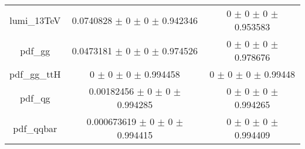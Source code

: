 \begin{table}
\begin{tabular}{ccc}
lumi\_13TeV & \num{0.0740828} $\pm$ \num{0} $\pm$ \num{0} $\pm$ \num{0.942346} & \num{0} $\pm$ \num{0} $\pm$ \num{0} $\pm$ \num{0.953583}\\
pdf\_gg & \num{0.0473181} $\pm$ \num{0} $\pm$ \num{0} $\pm$ \num{0.974526} & \num{0} $\pm$ \num{0} $\pm$ \num{0} $\pm$ \num{0.978676}\\
pdf\_gg\_ttH & \num{0} $\pm$ \num{0} $\pm$ \num{0} $\pm$ \num{0.994458} & \num{0} $\pm$ \num{0} $\pm$ \num{0} $\pm$ \num{0.99448}\\
pdf\_qg & \num{0.00182456} $\pm$ \num{0} $\pm$ \num{0} $\pm$ \num{0.994285} & \num{0} $\pm$ \num{0} $\pm$ \num{0} $\pm$ \num{0.994265}\\
pdf\_qqbar & \num{0.000673619} $\pm$ \num{0} $\pm$ \num{0} $\pm$ \num{0.994415} & \num{0} $\pm$ \num{0} $\pm$ \num{0} $\pm$ \num{0.994409}\\
\bottomrule
\end{tabular}
\end{table}